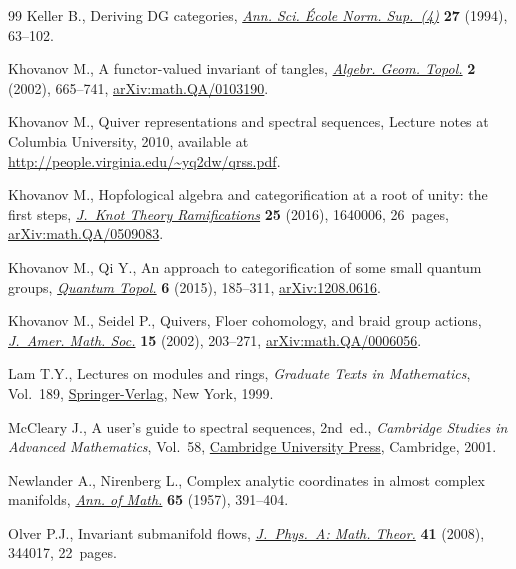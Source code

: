 \documentclass[10pt,a4paper]{amsart}
\theoremstyle{definition}
\numberwithin{equation}{section}
\begin{document}
\begin{thebibliography}{99}
Keller B., Deriving {DG} categories, \href{https://doi.org/10.24033/asens.1689}{\textit{Ann. Sci. \'Ecole Norm. Sup.~(4)}} \textbf{27} (1994), 63--102.

Khovanov M., A functor-valued invariant of tangles, \href{https://doi.org/10.2140/agt.2002.2.665}{\textit{Algebr. Geom.
 Topol.}} \textbf{2} (2002), 665--741, \href{https://arxiv.org/abs/math.QA/0103190}{arXiv:math.QA/0103190}.

Khovanov M., Quiver representations and spectral sequences, {L}ecture notes at
 Columbia University, 2010, available at
 \url{http://people.virginia.edu/~yq2dw/qrss.pdf}.

Khovanov M., Hopfological algebra and categorification at a root of unity: the
 first steps, \href{https://doi.org/10.1142/S021821651640006X}{\textit{J.~Knot Theory Ramifications}} \textbf{25} (2016),
 1640006, 26~pages, \href{https://arxiv.org/abs/math.QA/0509083}{arXiv:math.QA/0509083}.

Khovanov M., Qi Y., An approach to categorification of some small quantum
 groups, \href{https://doi.org/10.4171/QT/63}{\textit{Quantum Topol.}} \textbf{6} (2015), 185--311,
 \href{https://arxiv.org/abs/1208.0616}{arXiv:1208.0616}.

Khovanov M., Seidel P., Quivers, {F}loer cohomology, and braid group actions,
 \href{https://doi.org/10.1090/S0894-0347-01-00374-5}{\textit{J.~Amer. Math. Soc.}} \textbf{15} (2002), 203--271, \href{https://arxiv.org/abs/math.QA/0006056}{arXiv:math.QA/0006056}.

Lam T.Y., Lectures on modules and rings, \textit{Graduate Texts in
 Mathematics}, Vol.~189, \href{https://doi.org/10.1007/978-1-4612-0525-8}{Springer-Verlag}, New York, 1999.

McCleary J., A user's guide to spectral sequences, 2nd~ed., \textit{Cambridge Studies in
 Advanced Mathematics}, Vol.~58, \href{https://doi.org/10.1017/CBO9780511626289}{Cambridge University Press}, Cambridge, 2001.

Newlander A., Nirenberg L., Complex analytic coordinates in almost complex
 manifolds, \href{https://doi.org/10.2307/1970051}{\textit{Ann. of Math.}} \textbf{65} (1957), 391--404.

Olver P.J., Invariant submanifold flows, \href{https://doi.org/10.1088/1751-8113/41/34/344017}{\textit{J.~Phys.~A: Math. Theor.}}
 \textbf{41} (2008), 344017, 22~pages.


\end{thebibliography}
\end{document}
